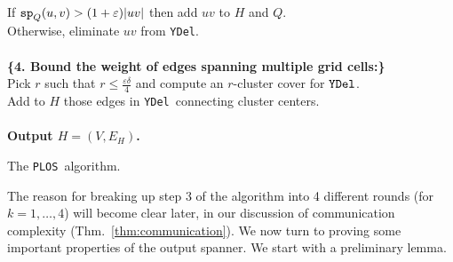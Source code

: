 \documentclass{llncs}
\newcommand{\e}{\varepsilon}
\newcommand{\ssp}{{\tt sp}}
\newcommand{\palg}{{\tt PLOS}}
\newcommand{\ydel}{{\tt YDel}}
\begin{document}
\begin{table}[htpb]
\begin{center}
{\begin{minipage}[ht]{0.98\linewidth}
{\begin{tabbing}
\>   \> \> \> If $\ssp_{Q}(u, v) > (1+\e)|uv|$ then add $uv$ to $H$ and $Q$.\\
\>   \> \> \> Otherwise, eliminate $uv$ from \ydel. \\
\\
{\bf \{4. Bound the weight of edges spanning multiple grid cells:\}} \\
\> Pick $r$ such that $r \le \frac{\e\delta}{4}$ and compute an $r$-cluster cover for $\ydel$. \\\> Add to $H$ those edges in \ydel\ connecting cluster centers. \\
\\
{\bf Output $H = (V, E_H)$.}
\end{tabbing}}
\end{minipage}
}\end{center}
\caption{The \palg\ algorithm.}
\label{tab:palg}
\end{table}
The reason for breaking up step 3 of the algorithm into 4 different rounds (for $k = 1,\ldots,4$) will become clear later, in our discussion of communication complexity (Thm.~\ref{thm:communication}). We now turn to proving some important properties of the output spanner. We start with a preliminary lemma.
\end{document}
